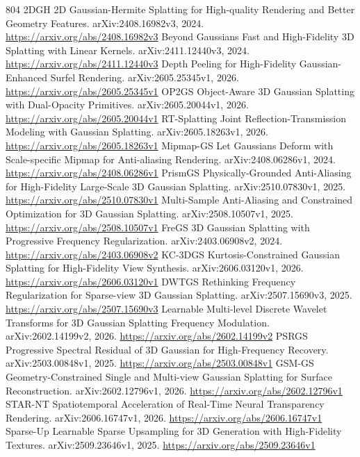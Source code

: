 \documentclass[11pt]{article}
\begin{document}
\begin{thebibliography}{804}
 2DGH 2D Gaussian-Hermite Splatting for High-quality Rendering and Better Geometry Features. arXiv:2408.16982v3, 2024. \url{https://arxiv.org/abs/2408.16982v3}
 Beyond Gaussians Fast and High-Fidelity 3D Splatting with Linear Kernels. arXiv:2411.12440v3, 2024. \url{https://arxiv.org/abs/2411.12440v3}
 Depth Peeling for High-Fidelity Gaussian-Enhanced Surfel Rendering. arXiv:2605.25345v1, 2026. \url{https://arxiv.org/abs/2605.25345v1}
 OP2GS Object-Aware 3D Gaussian Splatting with Dual-Opacity Primitives. arXiv:2605.20044v1, 2026. \url{https://arxiv.org/abs/2605.20044v1}
 RT-Splatting Joint Reflection-Transmission Modeling with Gaussian Splatting. arXiv:2605.18263v1, 2026. \url{https://arxiv.org/abs/2605.18263v1}
 Mipmap-GS Let Gaussians Deform with Scale-specific Mipmap for Anti-aliasing Rendering. arXiv:2408.06286v1, 2024. \url{https://arxiv.org/abs/2408.06286v1}
 PrismGS Physically-Grounded Anti-Aliasing for High-Fidelity Large-Scale 3D Gaussian Splatting. arXiv:2510.07830v1, 2025. \url{https://arxiv.org/abs/2510.07830v1}
 Multi-Sample Anti-Aliasing and Constrained Optimization for 3D Gaussian Splatting. arXiv:2508.10507v1, 2025. \url{https://arxiv.org/abs/2508.10507v1}
 FreGS 3D Gaussian Splatting with Progressive Frequency Regularization. arXiv:2403.06908v2, 2024. \url{https://arxiv.org/abs/2403.06908v2}
 KC-3DGS Kurtosis-Constrained Gaussian Splatting for High-Fidelity View Synthesis. arXiv:2606.03120v1, 2026. \url{https://arxiv.org/abs/2606.03120v1}
 DWTGS Rethinking Frequency Regularization for Sparse-view 3D Gaussian Splatting. arXiv:2507.15690v3, 2025. \url{https://arxiv.org/abs/2507.15690v3}
 Learnable Multi-level Discrete Wavelet Transforms for 3D Gaussian Splatting Frequency Modulation. arXiv:2602.14199v2, 2026. \url{https://arxiv.org/abs/2602.14199v2}
 PSRGS Progressive Spectral Residual of 3D Gaussian for High-Frequency Recovery. arXiv:2503.00848v1, 2025. \url{https://arxiv.org/abs/2503.00848v1}
 GSM-GS Geometry-Constrained Single and Multi-view Gaussian Splatting for Surface Reconstruction. arXiv:2602.12796v1, 2026. \url{https://arxiv.org/abs/2602.12796v1}
 STAR-NT Spatiotemporal Acceleration of Real-Time Neural Transparency Rendering. arXiv:2606.16747v1, 2026. \url{https://arxiv.org/abs/2606.16747v1}
 Sparse-Up Learnable Sparse Upsampling for 3D Generation with High-Fidelity Textures. arXiv:2509.23646v1, 2025. \url{https://arxiv.org/abs/2509.23646v1}

\end{thebibliography}
\end{document}
